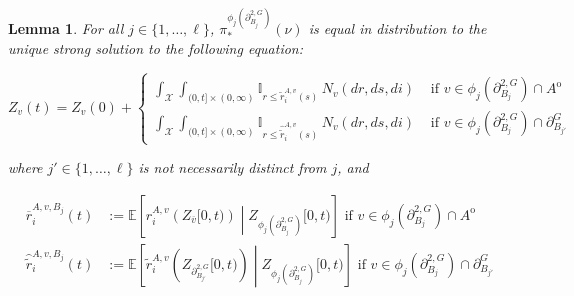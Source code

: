 \documentclass[12pt]{article}
\newcommand{\mb}{\mathbb}
\newcommand{\mc}{\mathcal}
\newcommand{\ov}{\overline}
\newcommand{\te}{\text}
\newcommand{\ex}[1]{\mb{E}\left[#1\right]}			%
\newcommand{\defeq}{:=}								%
\newcommand{\sta}{\mc{X}}							%
\newcommand{\gneigh}[2]{\partial^{#1}_{#2}}			%
\newcommand{\dgneigh}[2]{\partial^{2,#1}_{#2}}		%
\newcommand{\cl}[1]{\ov{#1}}						%
\newcommand{\poiss}{N}								%
\newcommand{\rate}{r}								%
\newcommand{\proj}{\pi}								%
\newcommand{\poissv}[1]{_{#1}}						%
\newcommand{\vind}[1]{_{#1}}						%
\newcommand{\tme}[1]{(#1)}							%
\newcommand{\tmi}[1]{#1}							%
\newcommand{\vpara}[1]{^{#1}}						%
\newcommand{\stpara}[1]{_{#1}}						%
\newcommand{\gvpara}[2]{^{#1,#2}}					%
\newcommand{\psf}{_*}								%
\newcommand{\psize}{\ell}							%
\newcommand{\brate}{\alt{\rate}}					%
\newcommand{\inte}[1]{{#1}^\mathrm{o}}				%
\newcommand{\alt}[1]{\tilde{#1}}					%
\newcommand{\mm}{\nu}								%
\newcommand{\Xh}{Z}									%
\newcommand{\bgrate}{\ov{\rate}}					%
\newcommand{\bcrate}{\hat{\brate}}					%
\newcommand{\gvjpara}[3]{^{#1,#2,#3}}				%
\newtheorem{lem}[thms]{Lemma}
\begin{document}
\begin{lem}
For all \(j \in \{1,\dots,\psize\}\), \(\proj\psf\vpara{\phi_j(\dgneigh{G}{B_j})}(\mm)\) is equal in distribution to the unique strong solution to the following equation:

\begin{equation}
\Xh\vind{v}\tme{t} = \Xh\vind{v}\tme{0} + \begin{cases}
\int_\sta\int_{(0,t]\times (0,\infty)} \mb{I}_{r \leq \brate\gvpara{A}{v}\stpara{i}(s)}\,\poiss\poissv{v}(dr,ds,di)&\te{ if } v \in \phi_j(\dgneigh{G}{B_j})\cap \inte{A}\\
\int_\sta\int_{(0,t]\times (0,\infty)} \mb{I}_{r \leq \bcrate\gvpara{A}{v}\stpara{i}(s)}\,\poiss\poissv{v}(dr,ds,di)&\te{ if } v \in \phi_j(\dgneigh{G}{B_j})\cap\gneigh{G}{B_{j'}}
\end{cases}
\label{Uq::marg1eqn}
\end{equation}

where \(j' \in \{1,\dots,\psize\}\) is not necessarily distinct from \(j\), and

\begin{align}
\bgrate\gvjpara{A}{v}{B_j}\stpara{i}(t) &\defeq \ex{\rate\gvpara{A}{v}\stpara{i}\left(\Xh\vind{\cl{v}}\tmi{[0,t)}\right)\middle|\Xh\vind{\phi_j(\dgneigh{G}{B_j})}\tmi{[0,t)}} \te{ if } v \in  \phi_j(\dgneigh{G}{B_j})\cap \inte{A} \label{Uq::brrt}\\
\bcrate\gvjpara{A}{v}{B_j}\stpara{i}(t) &\defeq \ex{\brate\gvpara{A}{v}\stpara{i}\left(\Xh\vind{\dgneigh{G}{B_{j'}}}\tmi{[0,t)}\right)\middle| \Xh\vind{\phi_j(\dgneigh{G}{B_j})}\tmi{[0,t)}} \te{ if } v \in \phi_j(\dgneigh{G}{B_j})\cap\gneigh{G}{B_{j'}}\label{Uq::brcdrt}
\end{align}
\label{Uq::marg}
\end{lem}
\end{document}
